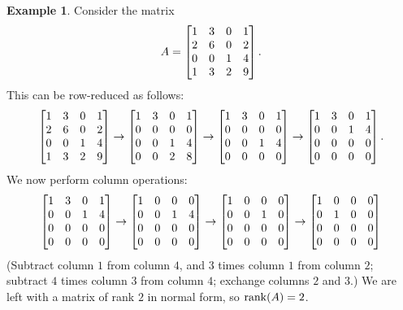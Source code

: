 \documentclass[reqno]{amsart}
\theoremstyle{definition}
\newtheorem{example}[theorem]{Example}
\begin{document}
\begin{example}\label{eg-normal-form-i}
 Consider the matrix
 \[ A = \left[\begin{matrix} 1&3&0&1 \\ 2&6&0&2 \\ 0&0&1&4 \\ 1&3&2&9 \end{matrix}\right]. \]
 This can be row-reduced as follows:
 \[ \left[\begin{matrix} 1&3&0&1 \\ 2&6&0&2 \\ 0&0&1&4 \\ 1&3&2&9 \end{matrix}\right]
    \to 
    \left[\begin{matrix} 1&3&0&1 \\ 0&0&0&0 \\ 0&0&1&4 \\ 0&0&2&8 \end{matrix}\right]
    \to 
    \left[\begin{matrix} 1&3&0&1 \\ 0&0&0&0 \\ 0&0&1&4 \\ 0&0&0&0 \end{matrix}\right]
    \to 
    \left[\begin{matrix} 1&3&0&1 \\ 0&0&1&4 \\ 0&0&0&0 \\ 0&0&0&0 \end{matrix}\right].
 \]
 We now perform column operations:
 \[ 
    \left[\begin{matrix} 1&3&0&1 \\ 0&0&1&4 \\ 0&0&0&0 \\ 0&0&0&0 \end{matrix}\right] 
    \to
    \left[\begin{matrix} 1&0&0&0 \\ 0&0&1&4 \\ 0&0&0&0 \\ 0&0&0&0 \end{matrix}\right] 
    \to
    \left[\begin{matrix} 1&0&0&0 \\ 0&0&1&0 \\ 0&0&0&0 \\ 0&0&0&0 \end{matrix}\right] 
    \to
    \left[\begin{matrix} 1&0&0&0 \\ 0&1&0&0 \\ 0&0&0&0 \\ 0&0&0&0 \end{matrix}\right] 
 \]
 (Subtract column $1$ from column $4$, and $3$ times column $1$
 from column $2$; subtract $4$ times column $3$ from column $4$;
 exchange columns $2$ and $3$.)  We are left with a matrix of rank $2$
 in normal form, so $\operatorname{rank}(A)=2$.
\end{example}
\end{document}
